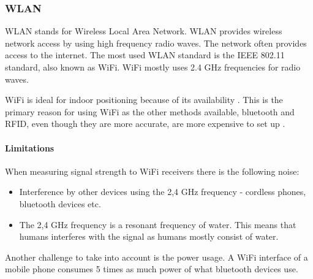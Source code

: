 \subsubsection{WLAN}\label{wifi}
WLAN stands for Wireless Local Area Network.
WLAN provides wireless network access by using high frequency radio waves.
The network often provides access to the internet.
The most used WLAN standard is the IEEE 802.11 standard\cite{ieee_wifi_standard}, also known as WiFi.
WiFi mostly uses 2.4 GHz frequencies for radio waves\cite{ieee_wifi_standard}.


WiFi is ideal for indoor positioning because of its availability
\cite{indoor_maps_google_slides}\cite{improving_wifi_using_bluetooth}.
This is the primary reason for using WiFi as the other methods available, bluetooth and RFID, even though they are more accurate, are more expensive to set up \cite{improving_wifi_using_bluetooth}.

\paragraph{Limitations}
When measuring signal strength to WiFi receivers there is the following noise:
 \begin{itemize}
 	\item Interference by other devices using the 2,4 GHz frequency - cordless phones, bluetooth devices etc.
 	\item The 2,4 GHz frequency is a resonant frequency of water. This means that humans interferes with the signal as humans mostly consist of water.
\end{itemize}

Another challenge to take into account is the power usage.
A WiFi interface of a mobile phone consumes 5 times as much power of what bluetooth devices use\cite{bluetooth_basics}.